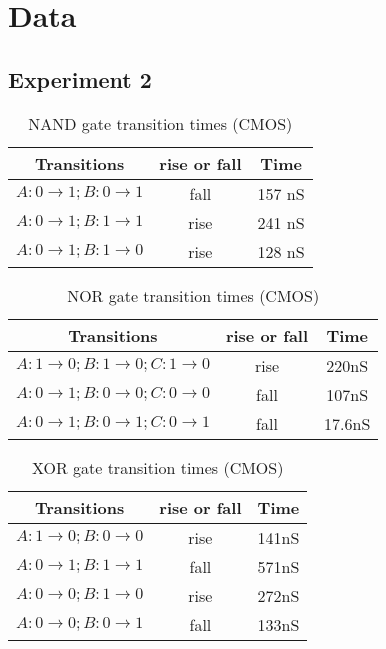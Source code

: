 \documentclass[10pt]{article}
\begin{document}
\section{Data}

\subsection{Experiment 2}

\begin{table}[H]
	\centering
	\begin{tabular}{ c|c|c }
	Transitions & rise or fall & Time \\ \hline
	$A:0 \rightarrow 1; B:0 \rightarrow 1$ & fall & 157 nS \\
	$A:0 \rightarrow 1; B:1 \rightarrow 1$ & rise & 241 nS \\
	$A:0 \rightarrow 1; B:1 \rightarrow 0$ & rise & 128 nS \\
	\end{tabular}
	\label{tbl:nand}
	\caption{NAND gate transition times (CMOS)}
\end{table}

\begin{table}[H]
	\centering
	\begin{tabular}{ c|c|c }
	Transitions & rise or fall & Time \\ \hline
	$A:1 \rightarrow 0; B:1 \rightarrow 0; C:1 \rightarrow 0$ & rise &
	220nS \\
	$A:0 \rightarrow 1; B:0 \rightarrow 0; C:0 \rightarrow 0$ & fall &
	107nS \\
	$A:0 \rightarrow 1; B:0 \rightarrow 1; C:0 \rightarrow 1$ & fall &
	17.6nS \\
	\end{tabular}
	\label{tbl:nor}
	\caption{NOR gate transition times (CMOS)}
\end{table}

\begin{table}[H]
	\centering
	\begin{tabular}{ c|c|c }
	Transitions & rise or fall & Time \\ \hline
	$A:1 \rightarrow 0; B:0 \rightarrow 0$ & rise &	141nS \\
	$A:0 \rightarrow 1; B:1 \rightarrow 1$ & fall & 571nS \\
	$A:0 \rightarrow 0; B:1 \rightarrow 0$ & rise &	272nS \\
	$A:0 \rightarrow 0; B:0 \rightarrow 1$ & fall &	133nS \\
	\end{tabular}
	\label{tbl:xor}
	\caption{XOR gate transition times (CMOS)}
\end{table}
\end{document}
